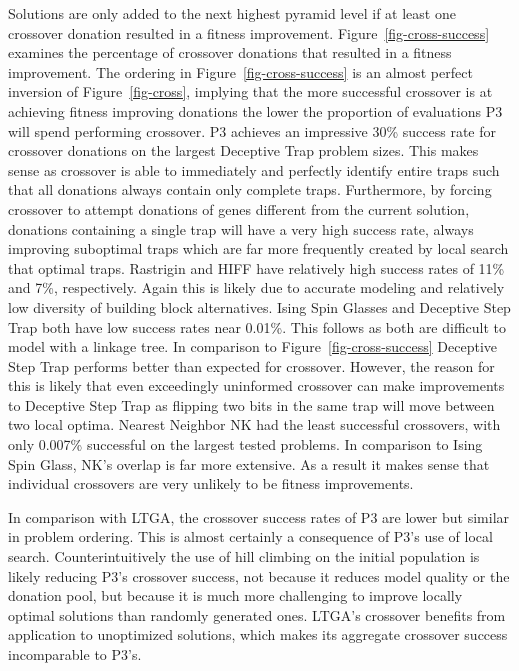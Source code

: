 \documentclass[twoside]{article}
\begin{document}
Solutions are only added to the next highest pyramid level if at least one crossover donation resulted in a fitness
improvement. Figure~\ref{fig-cross-success} examines the percentage of crossover donations that resulted in a fitness
improvement. The ordering in Figure~\ref{fig-cross-success} is an almost perfect inversion of Figure~\ref{fig-cross},
implying that the more successful crossover is at achieving fitness improving donations the lower the proportion of evaluations P3 will
spend performing crossover. P3 achieves an impressive 30\% success rate for crossover donations on the largest Deceptive Trap
problem sizes. This makes sense as crossover is able to immediately and perfectly identify entire traps such that all donations
always contain only complete traps. Furthermore, by forcing crossover to attempt donations of genes different from the current solution,
donations containing a single trap will have a very high success rate, always improving suboptimal traps which are far more frequently
created by local search that optimal traps. Rastrigin and HIFF have relatively high success rates of 11\% and 7\%, respectively. Again
this is likely due to accurate modeling and relatively low diversity of building block alternatives.
Ising Spin Glasses and Deceptive Step Trap both have low success rates near 0.01\%. This follows as both are difficult to model with
a linkage tree. In comparison to Figure~\ref{fig-cross-success} Deceptive Step Trap performs better than expected for crossover.
However, the reason for this is likely that even exceedingly uninformed crossover can make improvements to Deceptive Step Trap as
flipping two bits in the same trap will move between two local optima. Nearest Neighbor NK had the least successful crossovers,
with only 0.007\% successful on the largest tested problems. In comparison to Ising Spin Glass, NK's overlap is far more extensive.
As a result it makes sense that individual crossovers are very unlikely to be fitness improvements.

In comparison with LTGA, the crossover success rates of P3 are lower but similar in problem ordering. This is almost certainly
a consequence of P3's use of local search. Counterintuitively the use of hill climbing on the initial population is likely reducing
P3's crossover success, not because it reduces model quality or the donation pool, but because it is much more challenging to improve
locally optimal solutions than randomly generated ones. LTGA's crossover benefits from application to unoptimized solutions, which
makes its aggregate crossover success incomparable to P3's.
\end{document}
